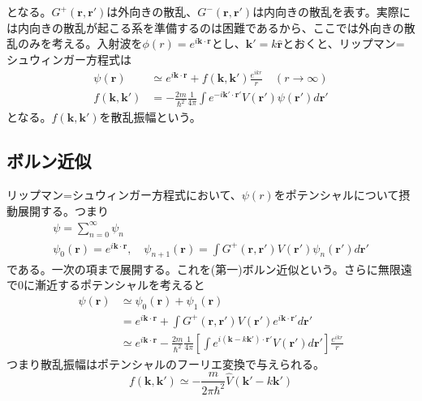     となる。$G^+(\bm{r}, \bm{r'})$は外向きの散乱、$G^-(\bm{r}, \bm{r'})$は内向きの散乱を表す。実際には内向きの散乱が起こる系を準備するのは困難であるから、ここでは外向きの散乱のみを考える。入射波を$\phi(r) = e^{i\bm{k} \cdot \bm{r}}$とし、$\bm{k'} = k\bm{\hat{r}}$とおくと、リップマン=シュウィンガー方程式は
    \begin{align*}
        \psi(\bm{r}) &\simeq e^{i\bm{k} \cdot \bm{r}} + f(\bm{k}, \bm{k'})\frac{e^{ikr}}{r} \quad (r \to \infty)\\
        f(\bm{k}, \bm{k'}) &= -\frac{2m}{\hbar^2}\frac{1}{4\pi} \int e^{-i\bm{k'} \cdot \bm{r'}}V(\bm{r'})\psi(\bm{r'}) d\bm{r'}
    \end{align*}
    となる。$f(\bm{k}, \bm{k'})$を散乱振幅という。

\subsection{ボルン近似}
    リップマン=シュウィンガー方程式において、$\psi(r)$をポテンシャルについて摂動展開する。つまり
    \begin{gather*}
        \psi = \sum_{n = 0}^\infty \psi_n\\
        \psi_0(\bm{r}) = e^{i\bm{k} \cdot \bm{r}}, \quad \psi_{n + 1}(\bm{r}) = \int G^+(\bm{r}, \bm{r'})V(\bm{r'})\psi_n(\bm{r'}) d\bm{r'}
    \end{gather*}
    である。一次の項まで展開する。これを(第一)ボルン近似という。さらに無限遠で0に漸近するポテンシャルを考えると
    \begin{align*}
        \psi(\bm{r})
            &\simeq \psi_0(\bm{r}) + \psi_1(\bm{r})\\
            &= e^{i\bm{k} \cdot \bm{r}} + \int G^+(\bm{r}, \bm{r'})V(\bm{r'})e^{i\bm{k} \cdot \bm{r'}} d\bm{r'}\\
            &\simeq e^{i\bm{k} \cdot \bm{r}} - \frac{2m}{\hbar^2}\frac{1}{4\pi} \left[\int e^{i(\bm{k} - k\bm{k'}) \cdot \bm{r'}}V(\bm{r'}) d\bm{r'}\right] \frac{e^{ikr}}{r}
    \end{align*}
    つまり散乱振幅はポテンシャルのフーリエ変換で与えられる。
        \[f(\bm{k}, \bm{k'}) \simeq -\frac{m}{2\pi\hbar^2}\hat{V}(\bm{k'} - k\bm{k'})\]

